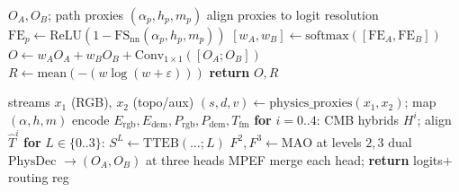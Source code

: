 \begin{algorithm}[htbp]
\caption{Mechanistic Path Equilibrium Fusion (MPEF)}
\label{alg:mpef}
\begin{algorithmic}
\Require \(O_A,O_B\); path proxies \((\alpha_p,h_p,m_p)\)
\State align proxies to logit resolution
\State \(\mathrm{FE}_p\leftarrow\mathrm{ReLU}(1-\mathrm{FS}_{\mathrm{nn}}(\alpha_p,h_p,m_p))\)
\State \([w_A,w_B]\leftarrow\mathrm{softmax}([\mathrm{FE}_A,\mathrm{FE}_B])\)
\State \(O\leftarrow w_A O_A+w_B O_B+\mathrm{Conv}_{1\times1}([O_A;O_B])\)
\State \(R\leftarrow\mathrm{mean}(-(w\log(w+\varepsilon)))\)
\State \textbf{return} \(O,R\)
\end{algorithmic}
\end{algorithm}

\begin{algorithm}[htbp]
\caption{PS-GPLNet forward}
\label{alg:forward}
\begin{algorithmic}
\Require streams \(x_1\) (RGB), \(x_2\) (topo/aux)
\State \((s,d,v)\leftarrow\mathrm{physics\_proxies}(x_1,x_2)\); map \((\alpha,h,m)\)
\State encode \(E_{\mathrm{rgb}},E_{\mathrm{dem}},P_{\mathrm{rgb}},P_{\mathrm{dem}},T_{\mathrm{fm}}\)
\State \textbf{for} \(i=0..4\): CMB hybrids \(H^{i}\); align \(\hat{T}^{i}\)
\State \textbf{for} \(L\in\{0..3\}\): \(S^{L}\leftarrow\mathrm{TTEB}(\ldots;L)\)
\State \(F^{2},F^{3}\leftarrow\mathrm{MAO}\) at levels \(2,3\)
\State dual \(\mathrm{PhysDec}\) \(\rightarrow(O_A,O_B)\) at three heads
\State MPEF merge each head; \textbf{return} logits$+$routing reg
\end{algorithmic}
\end{algorithm}

